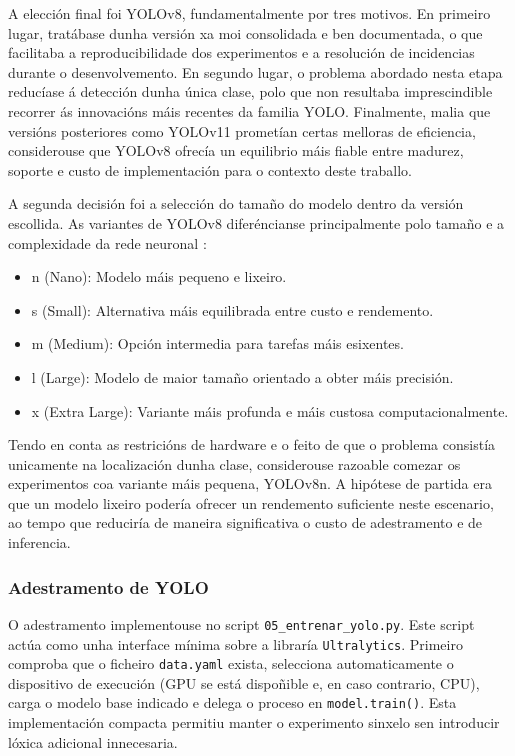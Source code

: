 A elección final foi YOLOv8, fundamentalmente por tres motivos. En primeiro lugar,
tratábase dunha versión xa moi consolidada e ben documentada, o que facilitaba a reproducibilidade
dos experimentos e a resolución de incidencias durante o desenvolvemento. En segundo lugar, o
problema abordado nesta etapa reducíase á detección dunha única clase, polo que non resultaba
imprescindible recorrer ás innovacións máis recentes da familia YOLO. Finalmente, malia que versións
posteriores como YOLOv11 prometían certas melloras de eficiencia, considerouse que YOLOv8 ofrecía un
equilibrio máis fiable entre madurez, soporte e custo de implementación para o contexto deste
traballo.

A segunda decisión foi a selección do tamaño do modelo dentro da versión escollida. As variantes de
YOLOv8 diferéncianse principalmente polo tamaño e a complexidade da rede neuronal
\cite{yolov8_ultralytics}:
\begin{itemize}
    \item n (Nano): Modelo máis pequeno e lixeiro.
    \item s (Small): Alternativa máis equilibrada entre custo e rendemento.
    \item m (Medium): Opción intermedia para tarefas máis esixentes.
    \item l (Large): Modelo de maior tamaño orientado a obter máis precisión.
    \item x (Extra Large): Variante máis profunda e máis custosa computacionalmente.
\end{itemize}

Tendo en conta as restricións de hardware e o feito de que o problema consistía unicamente na
localización dunha clase, considerouse razoable comezar os experimentos coa variante máis pequena,
YOLOv8n. A hipótese de partida era que un modelo lixeiro podería ofrecer un rendemento
suficiente neste escenario, ao tempo que reduciría de maneira significativa o custo de adestramento e
de inferencia.

\subsubsection{Adestramento de YOLO}
O adestramento implementouse no script \texttt{05\_entrenar\_yolo.py}. Este script actúa como unha interface mínima sobre a libraría
\texttt{Ultralytics}. Primeiro comproba que o ficheiro \texttt{data.yaml} exista, selecciona automaticamente
o dispositivo de execución (GPU se está dispoñible e, en caso contrario, CPU), carga o
modelo base indicado e delega o proceso en \texttt{model.train()}. Esta implementación compacta
permitiu manter o experimento sinxelo sen introducir lóxica adicional innecesaria.

